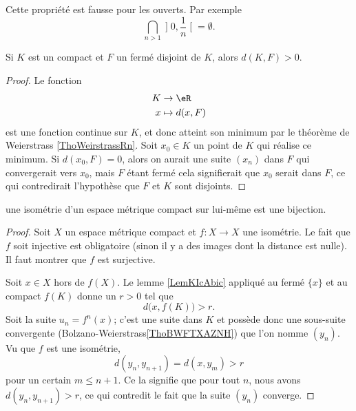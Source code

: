 \begin{remark}
    Cette propriété est fausse pour les ouverts. Par exemple
    \begin{equation}
        \bigcap_{n>1}\mathopen] 0 , \frac{1}{ n } \mathclose[=\emptyset.
    \end{equation}
\end{remark}

\begin{lemma}   \label{LemKIcAbic}
    Si \( K\) est un compact et \( F\) un fermé disjoint de \( K\), alors \( d(K,F)>0\).
\end{lemma}

\begin{proof}
    Le fonction 
    \begin{equation}
        \begin{aligned}
             K&\to \eR \\
            x&\mapsto d(x,F) 
        \end{aligned}
    \end{equation}
    est une fonction continue sur \( K\), et donc atteint son minimum par le théorème de Weierstrass \ref{ThoWeirstrassRn}. Soit \( x_0\in K\) un point de \( K\) qui réalise ce minimum. Si \( d(x_0,F)=0\), alors on aurait une suite \( (x_n)\) dans \( F\) qui convergerait vers \( x_0\), mais \( F\) étant fermé cela signifierait que \( x_0\) serait dans \( F\), ce qui contredirait l'hypothèse que \( F\) et \( K\) sont disjoints.
\end{proof}

\begin{proposition}
    une isométrie d'un espace métrique compact sur lui-même est une bijection.
\end{proposition}

\begin{proof}
    Soit \( X\) un espace métrique compact et \( f\colon X\to X\) une isométrie. Le fait que \( f\) soit injective est obligatoire (sinon il y a des images dont la distance est nulle). Il faut montrer que \( f\) est surjective.

    Soit \( x\in X\) hors de \( f(X)\). Le lemme \ref{LemKIcAbic} appliqué au fermé \( \{ x \}\) et au compact \( f(K)\) donne un \( r>0\) tel que
    \begin{equation}
        d\big( x,f(K)\big)>r.
    \end{equation}
    Soit la suite \( u_n=f^n(x)\); c'est une suite dans \( K\) et possède donc une sous-suite convergente (Bolzano-Weierstrass\ref{ThoBWFTXAZNH}) que l'on nomme \( (y_n)\). Vu que \( f\) est une isométrie,
    \begin{equation}
        d(y_{n},y_{n+1})=d(x,y_m)>r
    \end{equation}
    pour un certain \( m\leq n+1\). Ce la signifie que pour tout \( n\), nous avons \( d(y_n,y_{n+1})>r\), ce qui contredit le fait que la suite \( (y_n)\) converge.
\end{proof}

